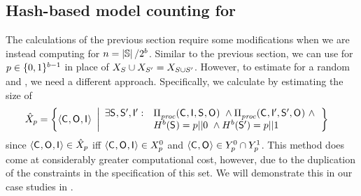 \subsection{Hash-based model counting for \JaccardRand{\secretsSetSize}}
\label{sscf:sec:impl:hashTriples}
The calculations of the previous section require some modifications
when we are instead computing \JaccardRand{\secretsSetSize} for
{$n = \left|{\mathbb{S}}\right|/2^{b}$}.  Similar to the
previous section, we can use
\possibleTriplesByPrefix{\hashFnOutputPrefix}{} for
$p \in \{0,1\}^{b-1}$ in place
of $X_{S_{}}\cup X_{S_{}'}=X_{S_{}\cup S_{}'}$.
However, to estimate
\setSize{\possibleTriplesIntersect{\secretsSet{}}{\secretsSetAlt{}}}
for a random \secretsSet{} and \secretsSetAlt{}, we need a different
approach.  Specifically, we calculate
\setSize{\possibleTriplesIntersect{\secretsSet{}}{\secretsSetAlt{}}}
by estimating the size of
\begin{align*}
\possibleTriplesIntersectByPrefix{\hashFnOutputPrefix} 
& = \left\{\langle\ACIFn{}, \AOOFn{}, \AIIFn{}\rangle ~\left|
     \begin{array}[m]{rl}
       \exists \SecFn{},\SecFnAlt{},\AIIFnAlt{}: &
       \postcondition{\proc}{}(\ACIFn{}, \AIIFn{}, \SecFn{}, \AOOFn{})~\wedge 
        \postcondition{\proc}{}(\ACIFn{}, \AIIFnAlt{},\SecFnAlt{}, \AOOFn{})~\wedge \\
       & \hashPrefixFn{\hashFnOutputPrefixBits}(\SecFn{}) = \concat{\hashFnOutputPrefix}{0}~\wedge 
        \hashPrefixFn{\hashFnOutputPrefixBits}(\SecFnAlt{}) = \concat{\hashFnOutputPrefix}{1}
\end{array}\right.\right\}
\end{align*}
since $\langle\mathsf{C}_{}, \mathsf{O}_{}, \mathsf{I}_{}\rangle \in
\hat{X}_{p}$ iff
$\langle\mathsf{C}_{}, \mathsf{O}_{}, \mathsf{I}_{}\rangle \in
X_{p}^{0}$ and
$\langle\mathsf{C}_{}, \mathsf{O}_{}\rangle \in
Y_{p}^{0} \cap
Y_{p}^{1}$.  This method does
come at considerably greater computational cost, however, due to the
duplication of the constraints \postcondition{\proc}{} in the
specification of this set.  We will demonstrate this in our case
studies in .

